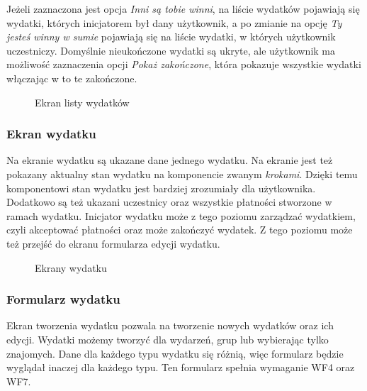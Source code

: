 Jeżeli zaznaczona jest opcja \emph{Inni są tobie winni}, na liście wydatków pojawiają się wydatki, których inicjatorem był dany użytkownik, a po zmianie na opcję \emph{Ty jesteś winny w sumie} pojawiają się na liście wydatki, w których użytkownik uczestniczy. Domyślnie nieukończone wydatki są ukryte, ale użytkownik ma możliwość zaznaczenia opcji \emph{Pokaż zakończone}, która pokazuje wszystkie wydatki włączając w to te zakończone.

\begin{figure}[h]%
    \centering
    \caption{Ekran listy wydatków}%
\end{figure}

\clearpage
\subsubsection{Ekran wydatku}
Na ekranie wydatku są ukazane dane jednego wydatku. Na ekranie jest też pokazany aktualny stan wydatku na komponencie zwanym \emph{krokami}. Dzięki temu komponentowi stan wydatku jest bardziej zrozumiały dla użytkownika. Dodatkowo są też ukazani uczestnicy oraz wszystkie płatności stworzone w ramach wydatku. Inicjator wydatku może z tego poziomu zarządzać wydatkiem, czyli akceptować płatności oraz może zakończyć wydatek. Z tego poziomu może też przejść do ekranu formularza edycji wydatku.

\begin{figure}[h!]%
    \centering
    \qquad
    \qquad
    \qquad
    \caption{Ekrany wydatku}%
\end{figure}

\clearpage
\subsubsection{Formularz wydatku}
Ekran tworzenia wydatku pozwala na tworzenie nowych wydatków oraz ich edycji. Wydatki możemy tworzyć dla wydarzeń, grup lub wybierając tylko znajomych. Dane dla każdego typu wydatku się różnią, więc formularz będzie wyglądał inaczej dla każdego typu. Ten formularz spełnia wymaganie WF4 oraz WF7.


